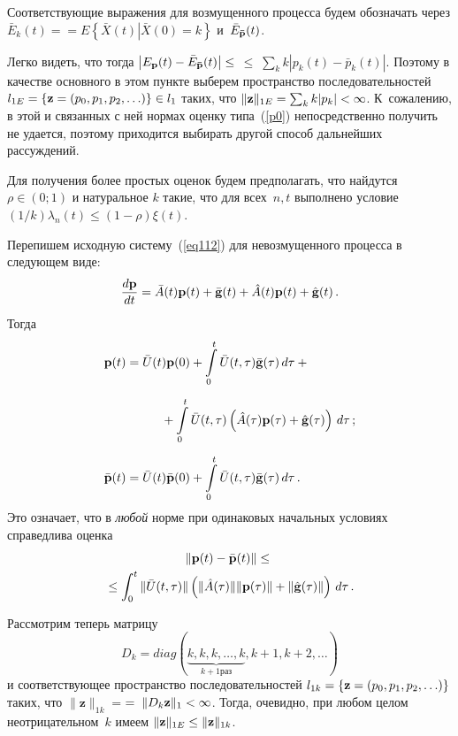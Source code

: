 \begin{multicols}{2}
Соответствующие выражения для возмущенного процесса будем обозначать через  
$\bar{E}_k(t) =$\linebreak $= E\left\{\bar{X}(t)\left|\bar{X}(0)=k\right.\right\}$ и~$\bar{E}_{\bf \bar{p}}(t)$.


Легко видеть, что тогда $\left|E_{\bf p}(t)- \bar{E}_{\bf \bar{p}}(t)\right| \le$\linebreak
$\le\;\sum_k k|p_k(t)-\bar{p}_k(t)|$. 
Поэтому в качестве основного в этом пункте выберем пространство последовательностей
 $l_{1E}=\left\{{\bf z} =(p_0,p_1,p_2,\ldots)\right\} \in l_1$ таких, что 
 $\|{\bf z}\|_{1E}=\sum_k k|p_k| <\infty$. К~сожалению, в этой и связанных с ней нормах оценку типа~(\ref{p0}) 
 непосредственно получить не удается, поэтому приходится выбирать другой способ дальнейших рассуждений.

Для получения более простых оценок будем предполагать, что найдутся  $\rho \in (0;1)$ и натуральное  $k$ такие, 
что для всех~$n,t$ выполнено условие  $(1/k) \lambda_n(t) \le (1-\rho)\xi(t)$.

Перепишем исходную систему~(\ref{eq112}) для невозмущенного процесса в следующем виде:
\begin{equation*}
\displaystyle\frac{\displaystyle d{\bf p}\mathstrut}{\displaystyle dt\mathstrut}=\bar{A}(t){\bf p}(t) + \bar{\bf g}(t)+\hat{A}(t){\bf p}(t)+\hat{\bf g}(t)\,.
\end{equation*}
Тогда
\begin{align*}
\vpi(t)&=\bar{U}(t)\vpi(0)+\int\limits_0^t \bar{U}(t,\tau)\bar{\bf g}(\tau) \, d\tau+{}\\[6pt]
&\hspace{10mm}{}+\int\limits_0^t \bar{U}(t,\tau)
\left(\hat{A}(\tau){\bf p}(\tau) + \hat{\bf g}(\tau)\right)\, d\tau\,;\\[6pt]
\bar{\vpi}(t)&=\bar{U}(t)\bar{\vpi}(0)+\int\limits_0^t \bar{U}(t,\tau)\bar{\bf g}(\tau) \, d\tau \,.
\end{align*}
Это означает, что
в {\it любой} норме при одинаковых начальных условиях справедлива оценка
\begin{multline}
\left\|{\mathbf p}(t)-\bar{{\mathbf p}}(t)\right\|\le{}\\
{}\le \int_0^t \|\bar{U}(t,\tau)\|
\left(\|\hat{A}(\tau)\|\|{\bf p}(\tau)\| + \|\hat{\mathbf g}(\tau)\|\right)\, d\tau\,.
\label{3000}
\end{multline}

Рассмотрим теперь матрицу
\begin{equation*}
D_k=diag\left( \underbrace{k, k, k, \dots , k}_{k+1 раз}, k+1, k+2, \dots \right)  
\end{equation*}
и соответствующее пространство последовательностей $l_{1k}=\left\{{\bf z} =(p_0,p_1,p_2,\ldots)\right\}$ таких, 
что $\|{\mathbf z}\|_{1k}=$\linebreak $=\;\|D_k {\bf z}\|_1 <\infty$. Тогда, очевидно, при любом целом неотрицательном~$k$ 
имеем $\|{\mathbf z}\|_{1E} \le \|{\bf z}\|_{1k}$.


\end{multicols}
